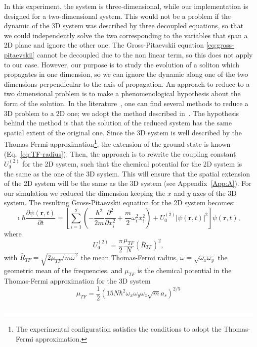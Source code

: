 In this experiment, the system is three-dimensional, while our implementation is designed for a two-dimensional system. This would not be a problem if the dynamic of the 3D system was described by three decoupled equations, so that we could independently solve the two corresponding to the variables that span a 2D plane and ignore the other one. The Gross-Pitaevskii equation \eqref{eq:gross-pitaevskii} cannot be decoupled due to the non linear term, so this does not apply to our case. However, our purpose is to study the evolution of a soliton which propagates in one dimension, so we can ignore the dynamic along one of the two dimensions perpendicular to the axis of propagation. An approach to reduce to a two dimensional problem is to make a phenomenological hypothesis about the form of the solution. In the literature~\citep{JKP98,SZ98,Sal01,SPR02,MM03}, one can find several methods to reduce a 3D problem to a 2D one; we adopt the method described in~\citep{PietroMassignan}.
 The hypothesis behind the method is that the solution of the reduced system has the same spatial extent of the original one. Since the 3D system is well described by the Thomas-Fermi approximation\footnote{The experimental configuration satisfies the conditions to adopt the Thomas-Fermi approximation.}, the extension of the ground state is known (Eq.~\eqref{eq:TF-radius}). Then, the approach is to rewrite the coupling constant $U_0^{(2)}$ for the 2D system, such that the chemical potential for the 2D system is the same as the one of the 3D system. This will ensure that the spatial extension of the 2D system will be the same as the 3D system (see Appendix~\ref{App:A}). For our simulation we reduced the dimension keeping the $x$ and $y$ axes of the 3D system. The resulting Gross-Pitaevskii equation for the 2D system becomes:
\begin{equation} \label{eq:gross-pitaevskii-simulation}
\imath \hbar \frac{\partial \psi(\textbf{r}, t)}{\partial t} = \left[ \sum_{i=1}^2 \left( -\frac{\hbar^2}{2m} \frac{\partial^2}{\partial x_i^2} + \frac{m}{2} \omega_i^2 x_i^2 \right) + U_0^{(2)} |\psi(\textbf{r}, t)|^2 \right] \psi(\textbf{r}, t),
\end{equation}
where
\begin{equation}
U_0^{(2)} = \frac{\pi}{2} \frac{\mu_{TF}}{N} \left( \bar{R}_{TF} \right)^2 ,
\end{equation}
with $\bar{R}_{TF} = \sqrt{2\mu_{TF} / m \bar{\omega}^2}$ the mean Thomas-Fermi radius, $\bar{\omega} = \sqrt{ \omega_x \omega_y}$ the geometric mean of the frequencies,
and $\mu_{TF}$ is the chemical potential in the Thomas-Fermi approximation for the 3D system
\begin{equation}
\mu_{TF} = \frac{1}{2} \left( 15 N \hbar^2 \omega_x \omega_y \omega_z \sqrt{m} a_s \right)^{2/5}
\end{equation}
\\


